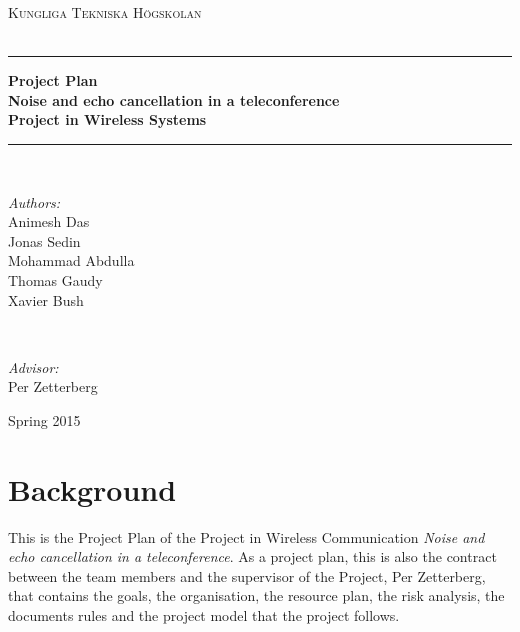 \documentclass[11pt]{article}
\newcommand{\HRule}{\rule{\linewidth}{0.5mm}}
\begin{document}
\begin{titlepage}
\begin{center}


\textsc{\LARGE Kungliga Tekniska Högskolan}\\[1.5cm]

\textsc{\Large ~}\\[-0.5cm]


\HRule
{ \huge \bfseries \textbf{Project Plan} \\ Noise and echo cancellation in a teleconference \\ Project in Wireless Systems \\[0.4cm] }

\HRule \\[1.1cm]

\begin{minipage}{0.4\textwidth}
\begin{flushleft}
\emph{Authors:}\\
Animesh Das \\ Jonas Sedin \\ Mohammad Abdulla \\ Thomas Gaudy \\ Xavier Bush
\end{flushleft}
\end{minipage}
~
\begin{minipage}{0.4\textwidth}
\begin{flushright}
\emph{Advisor:}\\
Per Zetterberg
\end{flushright}
\end{minipage}

\vfill

{\large Spring 2015} \\[1cm]
\end{center}



\end{titlepage}
\restoregeometry   



\pagebreak\tableofcontents
\pagebreak
\section{Background}

This is the Project Plan of the Project in Wireless Communication \textit{ Noise and echo cancellation in a teleconference}. As a project plan, this is also the contract between the team members and the supervisor of the Project, Per Zetterberg, that contains the goals, the organisation, the resource plan, the risk analysis, the documents rules and the project model that the project follows.
\end{document}

